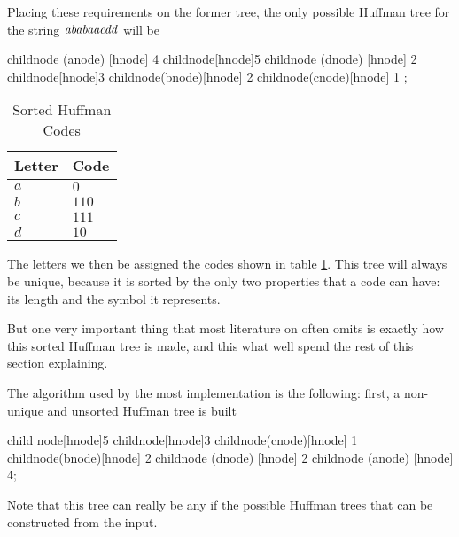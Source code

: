 Placing these requirements on the former tree, the only possible
Huffman tree for the string $\mathit{ababaacdd}$ will be

\begin{huffmanc}
  child{node (anode) [hnode] {4}}
  child{node[hnode]{5}
    child{node (dnode) [hnode] {2}}
    child{node[hnode]{3}
      child{node(bnode)[hnode] {2}}
      child{node(cnode)[hnode] {1}}
    }};

\end{huffmanc}

\begin{table}
  \centering
  \begin{tabular}{ll}
    \toprule
    Letter & Code \\
    \midrule
    $a$ & $0$ \\
    $b$ & $110$ \\
    $c$ & $111$ \\
    $d$ & $10$ \\
    \bottomrule
  \end{tabular}
  \caption{Sorted Huffman Codes}
  \label{tab:huffman-codes-sorted}
\end{table}

The letters we then be assigned the codes shown in table
\ref{tab:huffman-codes-sorted}. This tree will always be unique,
because it is sorted by the only two properties that a code can have:
its length and the symbol it represents.

But one very important thing that most literature on  often
omits is exactly how this sorted Huffman tree is made, and this
what well spend the rest of this section explaining.

The algorithm used by the most  implementation is the
following: first, a non-unique and unsorted Huffman tree is built

\begin{huffmanc}
  child {node[hnode]{5}
    child{node[hnode]{3}
      child{node(cnode)[hnode] {1}}
      child{node(bnode)[hnode] {2}}}
    child{node (dnode) [hnode] {2}}}
  child{node (anode) [hnode] {4}};

\end{huffmanc}

Note that this tree can really be any if the possible Huffman trees that can
be constructed from the input.

